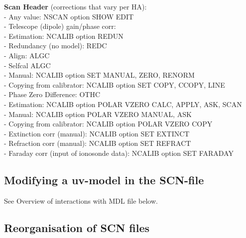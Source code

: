 {\bf Scan Header} (corrections that vary per HA):\\ 
- Any value: NSCAN option SHOW EDIT\\ 
- Telescope (dipole) gain/phase corr:\\ 
\hspace*{5mm} - Estimation: NCALIB option REDUN \\ 
\hspace*{10mm} - Redundancy (no model): REDC\\ 
\hspace*{10mm} - Align: ALGC\\ 
\hspace*{10mm} - Selfcal ALGC\\ 
\hspace*{5mm} - Manual: NCALIB option SET MANUAL, ZERO, RENORM \\ 
\hspace*{5mm} - Copying from calibrator: NCALIB option SET COPY, CCOPY, LINE\\ 
- Phase Zero Difference: OTHC\\ 
\hspace*{5mm} - Estimation: NCALIB option POLAR VZERO CALC, APPLY, ASK, SCAN \\ 
\hspace*{5mm} - Manual: NCALIB option POLAR VZERO MANUAL, ASK\\ 
\hspace*{5mm} - Copying from calibrator: NCALIB option POLAR VZERO COPY\\ 
- Extinction corr (manual): NCALIB option SET EXTINCT\\ 
- Refraction corr (manual): NCALIB option SET REFRACT\\ 
- Faraday corr (input of ionosonde data): NCALIB option SET FARADAY\\ 

\subsection{Modifying a uv-model in the SCN-file} 
\label{scn.uvmodel} 

	See Overview of interactions with MDL file below. 

\subsection{Reorganisation of SCN files} 
\label{scn.reorg} 


